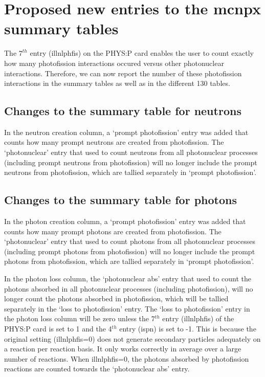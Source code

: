 \documentclass[fleqn,11pt]{article}
\begin{document}
\section{Proposed new entries to the mcnpx summary tables}

The $7^{th}$ entry (illnlphfis) on the PHYS:P card 
enables the user to count exactly how many photofission 
interactions occured versus other photonuclear 
interactions. Therefore, we can now report the number 
of these photofission interactions in the summary 
tables as well as in the different 130 tables. 

\subsection{Changes to the summary table for neutrons}
In the neutron creation column, a `prompt photofission'
entry was added that counts how many prompt neutrons are
created from photofission. The `photonuclear' entry that
used to count neutrons from all photonuclear processes
(including prompt neutrons from photofission) will no 
longer include the prompt neutrons from photofission, 
which are tallied separately in `prompt photofission'.

\subsection{Changes to the summary table for photons}
In the photon creation column, a `prompt photofission'
entry was added that counts how many prompt photons are 
created from photofission. The `photonuclear' entry that
used to count photons from all photonuclear processes
(including prompt photons from photofission) will no 
longer include the prompt photons from photofission, 
which are tallied separately in `prompt photofission'.

In the photon loss column, the `photonuclear abs' entry
that used to count the photons absorbed in all 
photonuclear processes (including photofission), will
no longer count the photons absorbed in photofission,
which will be tallied separately in the `loss to 
photofission' entry. The `loss to photofission' entry 
in the photon loss column will be zero unless the 
7$^{th}$ entry (illnlphfis) of the PHYS:P card is set 
to 1 and the 4$^{th}$ entry (ispn) is set to -1. This 
is because the original setting (illnlphfis=0) 
does not generate secondary particles adequately on a 
reaction per reaction basis. It only works correctly 
in average over a large number of reactions. When 
illnlphfis=0, the photons absorbed by photofission 
reactions are counted towards the `photonuclear abs' 
entry.
\end{document}

